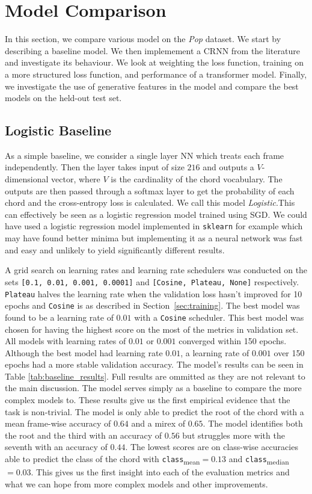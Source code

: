 \chapter{Model Comparison}

In this section, we compare various model on the \emph{Pop} dataset. We start by describing a baseline model. We then implemement a CRNN from the literature and investigate its behaviour. We look at weighting the loss function, training on a more structured loss function, and performance of a transformer model. Finally, we investigate the use of generative features in the model and compare the best models on the held-out test set.

\section{Logistic Baseline}

As a simple baseline, we consider a single layer NN which treats each frame independently. Then the layer takes input of size $216$ and outputs a $V$-dimensional vector, where $V$ is the cardinality of the chord vocabulary. The outputs are then passed through a softmax layer to get the probability of each chord and the cross-entropy loss is calculated. We call this model \emph{Logistic}.This can effectively be seen as a logistic regression model trained using SGD. We could have used a logistic regression model implemented in \texttt{sklearn} for example which may have found better minima but implementing it as a neural network was fast and easy and unlikely to yield significantly different results.

A grid search on learning rates and learning rate schedulers was conducted on the sets \texttt{[0.1, 0.01, 0.001, 0.0001]} and \texttt{[Cosine, Plateau, None]} respectively. \texttt{Plateau} halves the learning rate when the validation loss hasn't improved for 10 epochs and \texttt{Cosine} is as described in Section~\ref{sec:training}. The best model was found to be a learning rate of $0.01$ with a \texttt{Cosine} scheduler. This best model was chosen for having the highest score on the most of the metrics in validation set. All models with learning rates of $0.01$ or $0.001$ converged within 150 epochs. Although the best model had learning rate $0.01$, a learning rate of $0.001$ over 150 epochs had a more stable validation accuracy. The model's results can be seen in Table \ref{tab:baseline_results}. Full results are ommitted as they are not relevant to the main discussion. The model serves simply as a baseline to compare the more complex models to. These results give us the first empirical evidence that the task is non-trivial. The model is only able to predict the root of the chord with a mean frame-wise accuracy of $0.64$ and a mirex of $0.65$. The model identifies both the root and the third with an accuracy of $0.56$ but struggles more with the seventh with an accuracy of $0.44$. The lowest scores are on class-wise accuracies able to predict the class of the chord with \texttt{class}\textsubscript{mean}$=0.13$ and \texttt{class}\textsubscript{median}$=0.03$. This gives us the first insight into each of the evaluation metrics and what we can hope from more complex models and other improvements.

